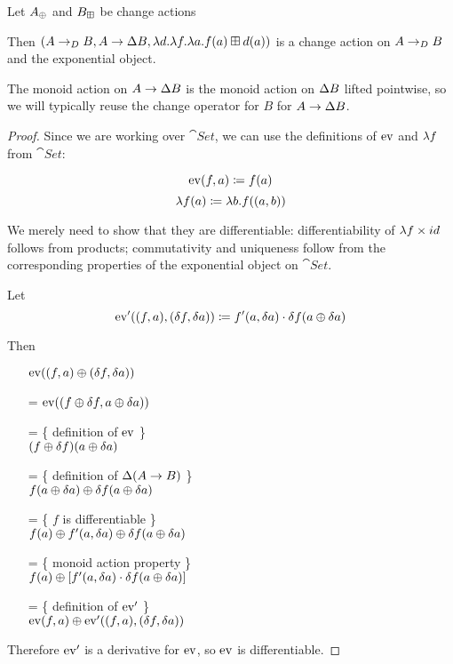 \begin{prop}[Exponentials]
\label{prop:exponentials}
  Let $A_\oplus$ and $B_\boxplus$ be change actions

  Then $(A \rightarrow_{D} B,A
    \rightarrow \Delta B,\lambda d. \lambda f. \lambda a. f(a) \boxplus
    d(a))$ is a change action on $A \rightarrow_{D} B$ and the exponential object.

  The monoid action on $A \rightarrow \Delta B$ is the monoid
  action on $\Delta B$ lifted pointwise, so we will typically reuse the
  change operator for $B$ for $A \rightarrow \Delta B$.
\end{prop}
\begin{proof}
  Since we are working over $\cat{Set}$, we can use the definitions of $\operatorname{ev}$ and
  $\lambda f$ from $\cat{Set}$:

  $$\operatorname{ev}(f, a) \coloneqq f(a)$$
  $$\lambda f(a) \coloneqq \lambda b. f((a, b))$$
  
  We merely need to show that they are differentiable: differentiability of $\lambda f
  \times id$ follows from products; commutativity and
  uniqueness follow from the corresponding properties of the exponential object
  on $\cat{Set}$.

  Let 
  $$\operatorname{ev}'((f, a), (\delta f, \delta a)) \coloneqq f'(a, \delta a) \cdot \delta f(a \oplus \delta a)$$

  Then
  \begin{itemize}
    \item[ ]$\operatorname{ev}((f, a) \oplus (\delta f, \delta a))$
    \item[=]$\operatorname{ev}((f \oplus \delta f, a \oplus \delta a))$
    \item[=]\{ definition of $\operatorname{ev}$ \}\\
      $(f \oplus \delta f)(a \oplus \delta a)$
    \item[=]\{ definition of $\Delta (A \rightarrow B)$ \}\\
      $f(a \oplus \delta a) \oplus \delta f(a \oplus \delta a)$
    \item[=]\{ $f$ is differentiable \}\\
      $f(a) \oplus f'(a, \delta a) \oplus \delta f(a \oplus \delta a)$
    \item[=]\{ monoid action property \}\\
      $f(a) \oplus \left[ f'(a, \delta a) \cdot \delta f(a \oplus \delta a)\right]$
    \item[=]\{ definition of $\operatorname{ev}'$ \}\\
      $\operatorname{ev}(f, a) \oplus \operatorname{ev}'((f, a), (\delta f, \delta a))$
  \end{itemize}
  Therefore $\operatorname{ev}'$ is a derivative for $\operatorname{ev}$, so $\operatorname{ev}$ is differentiable.
  

\end{proof}
